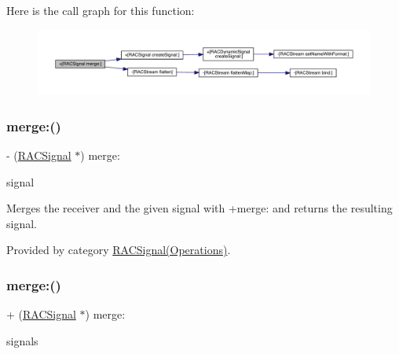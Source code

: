 Here is the call graph for this function\+:\nopagebreak
\begin{figure}[H]
\begin{center}
\leavevmode
\includegraphics[width=350pt]{interface_r_a_c_signal_a37d7e9c259ad5253a1f3ff644a86e52b_cgraph}
\end{center}
\end{figure}
\mbox{\label{interface_r_a_c_signal_aeda66daaf146a2d218ba7819297628a9}} 
\subsubsection{\texorpdfstring{merge\+:()}{merge:()}\hspace{0.1cm}{\footnotesize\ttfamily [3/6]}}
{\footnotesize\ttfamily -\/ (\mbox{\hyperlink{interface_r_a_c_signal}{R\+A\+C\+Signal}} $\ast$) merge\+: \begin{DoxyParamCaption}\item[{(\mbox{\hyperlink{interface_r_a_c_signal}{R\+A\+C\+Signal}} $\ast$)}]{signal }\end{DoxyParamCaption}}

Merges the receiver and the given signal with {\ttfamily +merge\+:} and returns the resulting signal. 

Provided by category \mbox{\hyperlink{category_r_a_c_signal_07_operations_08_aeda66daaf146a2d218ba7819297628a9}{R\+A\+C\+Signal(\+Operations)}}.

\mbox{\label{interface_r_a_c_signal_a37d7e9c259ad5253a1f3ff644a86e52b}} 
\subsubsection{\texorpdfstring{merge\+:()}{merge:()}\hspace{0.1cm}{\footnotesize\ttfamily [4/6]}}
{\footnotesize\ttfamily + (\mbox{\hyperlink{interface_r_a_c_signal}{R\+A\+C\+Signal}} $\ast$) merge\+: \begin{DoxyParamCaption}\item[{(id$<$ N\+S\+Fast\+Enumeration $>$)}]{signals }\end{DoxyParamCaption}}


